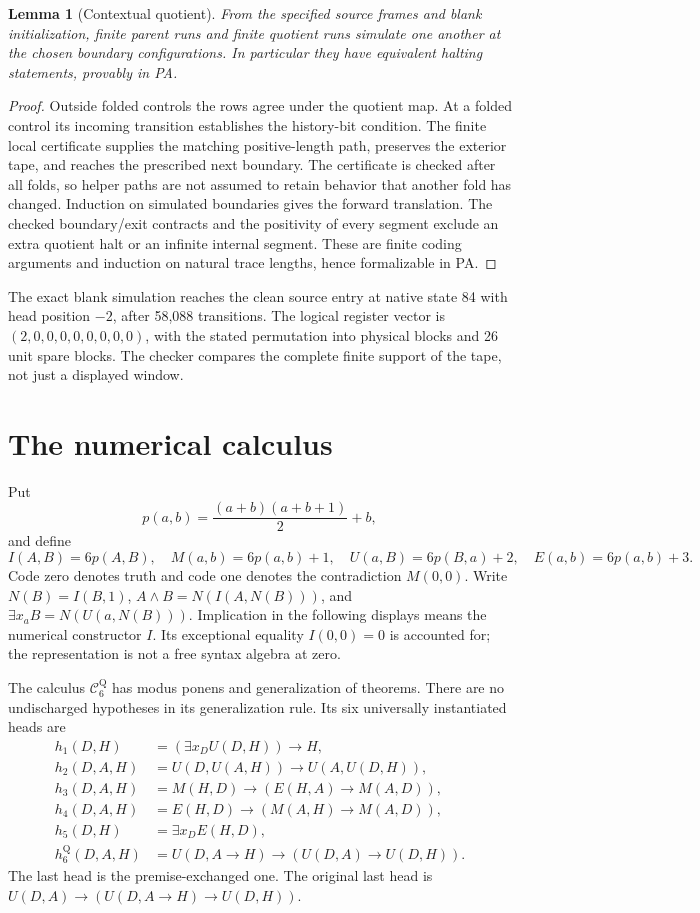 \documentclass[11pt,letterpaper]{article}
\newcommand{\CQ}{\mathcal C^{\mathrm Q}_6}
\newtheorem{lemma}[theorem]{Lemma}
\begin{document}
\begin{lemma}[Contextual quotient]\label{lem:quotient}
From the specified source frames and blank initialization, finite parent
runs and finite quotient runs simulate one another at the chosen boundary
configurations. In particular they have equivalent halting statements,
provably in PA.
\end{lemma}
\begin{proof}
Outside folded controls the rows agree under the quotient map. At a folded
control its incoming transition establishes the history-bit condition.
The finite local certificate supplies the matching positive-length path,
preserves the exterior tape, and reaches the prescribed next boundary.
The certificate is checked after all folds, so helper paths are not assumed
to retain behavior that another fold has changed. Induction on simulated
boundaries gives the forward translation. The checked boundary/exit
contracts and the positivity of every segment exclude an extra quotient
halt or an infinite internal segment. These are finite coding arguments
and induction on natural trace lengths, hence formalizable in PA.
\end{proof}

The exact blank simulation reaches the clean source entry at native state
84 with head position \(-2\), after 58,088 transitions. The logical register
vector is \((2,0,0,0,0,0,0,0,0)\), with the stated permutation into physical
blocks and 26 unit spare blocks. The checker compares the complete finite
support of the tape, not just a displayed window.

\section{The numerical calculus}\label{sec:calculus}

Put
\[
 p(a,b)=\frac{(a+b)(a+b+1)}2+b,
\]
and define
\[
 I(A,B)=6p(A,B),\quad M(a,b)=6p(a,b)+1,\quad
 U(a,B)=6p(B,a)+2,\quad E(a,b)=6p(a,b)+3.
\]
Code zero denotes truth and code one denotes the contradiction \(M(0,0)\).
Write \(N(B)=I(B,1)\), \(A\wedge B=N(I(A,N(B)))\), and
\(\exists x_a B=N(U(a,N(B)))\). Implication in the following displays means
the numerical constructor \(I\). Its exceptional equality \(I(0,0)=0\)
is accounted for; the representation is not a free syntax algebra at zero.

The calculus \(\CQ\) has modus ponens and generalization of theorems.
There are no undischarged hypotheses in its generalization rule. Its six
universally instantiated heads are
\begin{align*}
 h_1(D,H)&=(\exists x_D U(D,H))\to H,\\
 h_2(D,A,H)&=U(D,U(A,H))\to U(A,U(D,H)),\\
 h_3(D,A,H)&=M(H,D)\to(E(H,A)\to M(A,D)),\\
 h_4(D,A,H)&=E(H,D)\to(M(A,H)\to M(A,D)),\\
 h_5(D,H)&=\exists x_D E(H,D),\\
 h_6^{\mathrm Q}(D,A,H)&=U(D,A\to H)\to(U(D,A)\to U(D,H)).
\end{align*}
The last head is the premise-exchanged one. The original last head is
\(U(D,A)\to(U(D,A\to H)\to U(D,H))\).
\end{document}
